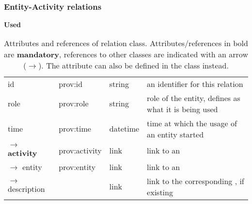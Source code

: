 \subsubsection{Entity-Activity relations}\label{sec:entity-activity-relations}

\begin{table}[ht]
\small
{}\textwidth
\textbf{\normalsize Used}\vspace{0.25em}\\
\begin{tabulary}{1.0\textwidth}{@{}lp{2.5cm}p{2cm}L@{}}
\toprule
{} &  &  & \\
\midrule
id & prov:id  & string & an identifier for this relation\\
role & prov:role & string   & role of the entity, defines as what it is being used\\
time & prov:time & datetime & time at which the usage of an entity started\\
\midrule
$\rightarrow$ \textbf{activity} & prov:activity & link & link to an \\
$\rightarrow$ entity & prov:entity & link & link to an \\
$\rightarrow$ description  &  & link & link to the corresponding , if existing\\
\bottomrule
\end{tabulary}
\caption[Attributes and references of  relation class]{Attributes and references of  relation class. Attributes/references in bold are \textbf{mandatory}, references to other classes are indicated with an arrow ($\rightarrow$). The  attribute can also be defined in the  class instead.}
\label{tab:used}
\end{table}


